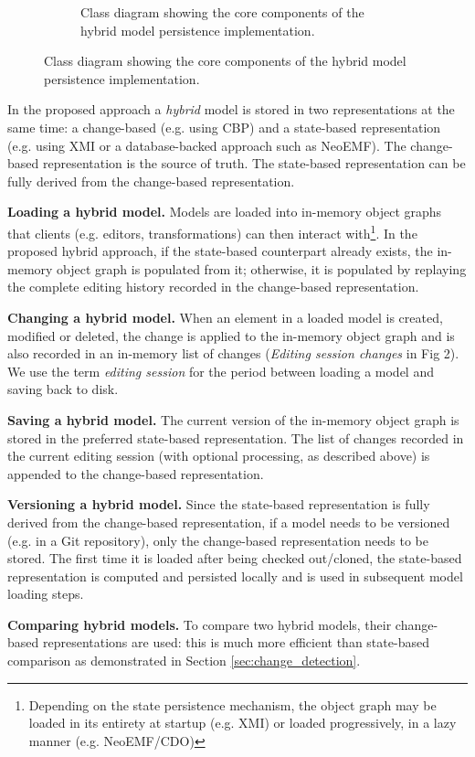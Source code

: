 \documentclass{llncs}
\begin{document}
\begin{figure}[ht]
\begin{subfigure}{0.49\linewidth}
        \caption{Class diagram showing the core components of the hybrid model persistence implementation.}
        \label{fig:class_diagram}
    \end{subfigure}
\end{figure}

In the proposed approach a \textit{hybrid} model is stored in two representations at the same time: a change-based (e.g. using CBP) and a state-based representation (e.g. using XMI or a database-backed approach such as NeoEMF). The change-based representation is the source of truth. The state-based representation can be fully derived from the change-based representation.

\textbf{Loading a hybrid model.} Models are loaded into in-memory object graphs that clients (e.g. editors, transformations) can then interact with\footnote{Depending on the state persistence mechanism, the object graph may be loaded in its entirety at startup (e.g. XMI) or loaded progressively, in a lazy manner (e.g. NeoEMF/CDO)}. In the proposed hybrid approach, if the state-based counterpart already exists, the in-memory object graph is populated from it; otherwise, it is populated by replaying the complete editing history recorded in the change-based representation.

\textbf{Changing a hybrid model.} When an element in a loaded model is created, modified or deleted, the change is applied to the in-memory object graph and is also recorded in an in-memory list of changes (\textit{Editing session changes} in Fig 2). We use the term \emph{editing session} for the period between loading a model and saving back to disk. 

\textbf{Saving a hybrid model.} The current version of the in-memory object graph is stored in the preferred state-based representation. The list of changes recorded in the current editing session (with optional processing, as described above) is appended to the change-based representation.

\textbf{Versioning a hybrid model.} Since the state-based representation is fully derived from the change-based representation, if a model needs to be versioned (e.g. in a Git repository), only the change-based representation needs to be stored. The first time it is loaded after being checked out/cloned, the state-based representation is computed and persisted locally and is used in subsequent model loading steps.

\textbf{Comparing hybrid models.} To compare two hybrid models, their change-based representations are used: this is much more efficient than state-based comparison as demonstrated in Section \ref{sec:change_detection}.
\end{document}
